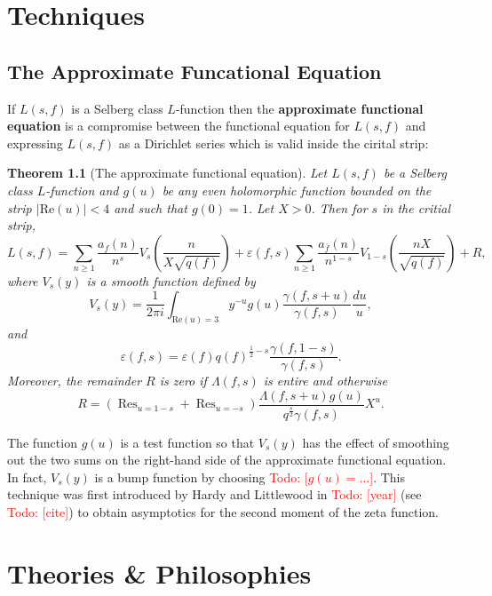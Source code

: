 \documentclass[12pt]{book}
\newtheorem{theorem}{Theorem}[section]
\theoremstyle{definition}\newframedtheorem{method}{Method}
\newcommand{\g}{\gamma}
\renewcommand{\L}{\Lambda}
\newcommand{\e}{\varepsilon}
\newcommand{\<}{\langle}
\renewcommand{\>}{\rangle}
\newcommand{\conj}{\overline}
\DeclareMathOperator*{\Res}{\mathrm{Res}}
\renewcommand{\Re}{\mathrm{Re}}
\newcommand{\todo}[1]{\textcolor{red}{\sf Todo: [#1]}}
\begin{document}
\chapter{Techniques}
  \section{The Approximate Funcational Equation}
    If $L(s,f)$ is a Selberg class $L$-function then the \textbf{approximate functional equation} is a compromise between the functional equation for $L(s,f)$ and expressing $L(s,f)$ as a Dirichlet series which is valid inside the cirital strip:

    \begin{theorem}[The approximate functional equation]
      Let $L(s,f)$ be a Selberg class $L$-function and $g(u)$ be any even holomorphic function bounded on the strip $|\Re(u)| < 4$ and such that $g(0) = 1$. Let $X > 0$. Then for $s$ in the critial strip,
      \[
        L(s,f) = \sum_{n \ge 1}\frac{a_{f}(n)}{n^{s}}V_{s}\left(\frac{n}{X\sqrt{q(f)}}\right)+\e(f,s)\sum_{n \ge 1}\frac{a_{\conj{f}}(n)}{n^{1-s}}V_{1-s}\left(\frac{nX}{\sqrt{q(f)}}\right)+R,
      \]
      where $V_{s}(y)$ is a smooth function defined by
      \[
        V_{s}(y) = \frac{1}{2\pi i}\int_{\Re(u) = 3}y^{-u}g(u)\frac{\g(f,s+u)}{\g(f,s)}\frac{du}{u},
      \]
      and
      \[
        \e(f,s) = \e(f)q(f)^{\frac{1}{2}-s}\frac{\g(f,1-s)}{\g(f,s)}.
      \]
      Moreover, the remainder $R$ is zero if $\L(f,s)$ is entire and otherwise
      \[
        R = \left(\Res_{u = 1-s}+\Res_{u = -s}\right)\frac{\L(f,s+u)g(u)}{q^{\frac{s}{2}}\g(f,s)}X^{u}.
      \]
    \end{theorem}

    The function $g(u)$ is a test function so that $V_{s}(y)$ has the effect of smoothing out the two sums on the right-hand side of the approximate functional equation. In fact, $V_{s}(y)$ is a bump function by choosing \todo{$g(u) = ...$}. This technique was first introduced by Hardy and Littlewood in \todo{year} (see \todo{cite}) to obtain asymptotics for the second moment of the zeta function.

\chapter{Theories \& Philosophies}
\end{document}

